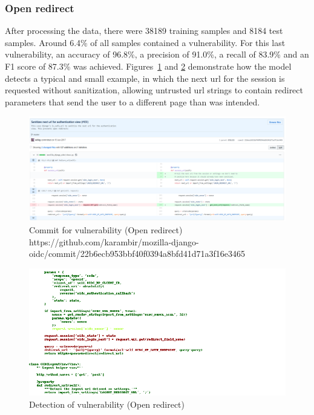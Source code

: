 \documentclass[
a4paper,
pagesize,
pdftex,
12pt,
twoside, %
BCOR=5mm, %
ngerman,
fleqn,
final,
]{scrartcl}
\begin{document}
	
	\newpage
	
	\subsubsection{Open redirect}
	After processing the data, there were 38189 training samples and 8184 test samples. Around 6.4\% of all samples contained a vulnerability. For this last vulnerability, an accuracy of 96.8\%, a precision of 91.0\%, a recall of 83.9\% and an F1 score of 87.3\% was achieved. Figures~\ref{fig:open_redirectA} and \ref{fig:open_redirectAr} demonstrate how the model detects a typical and small example, in which the next url for the session is requested without sanitization, allowing untrusted url strings to contain redirect parameters that send the user to a different page than was intended. 
		
	\begin{figure}[H]
		\centering
		\includegraphics[width=\linewidth]{Images/open_redirectA}
		\caption{Commit for vulnerability (Open redirect) \newline \scriptsize{
				https://github.com/karambir/mozilla-django-oidc/commit/22b6ecb953bbf40f0394a8bfd41d71a3f16e3465}}
		\label{fig:open_redirectA}
	\end{figure}
	\begin{figure}[H]
		\centering
		\includegraphics[width=\linewidth]{Images/open_redirectAr}
		\caption{Detection of vulnerability (Open redirect)}
		\label{fig:open_redirectAr}
	\end{figure}
	\newpage
\end{document}
